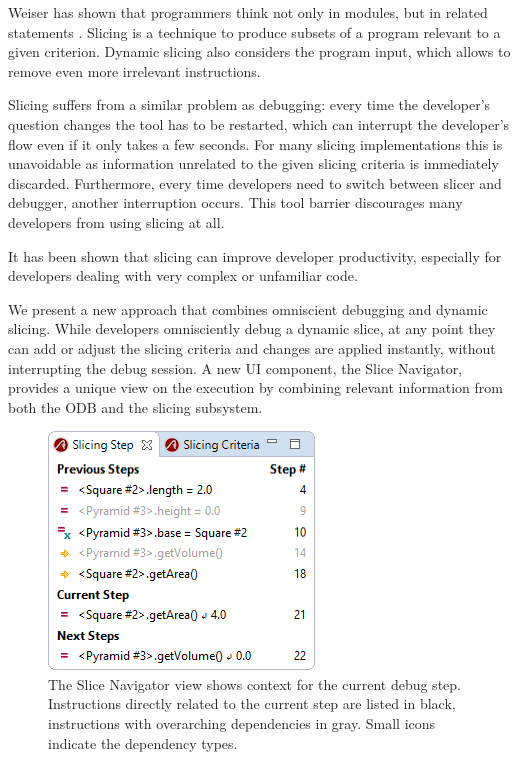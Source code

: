 ﻿\documentclass[
      english,
			conference,
      ]{IEEEtran}
\newcommand{\todo}[2][]{\pdfmargincomment[color=orange,icon=Note,subject={TODO},author={#1}]{#2}}
\begin{document}
Weiser has shown that programmers think not only in modules, but in related statements \cite{weiser_programmers_1982}.
Slicing is a technique to produce subsets of a program relevant to a given criterion.
Dynamic slicing also considers the program input, which allows to remove even more irrelevant instructions\todo{cite}.

Slicing suffers from a similar problem as debugging:
every time the developer's question changes the tool has to be restarted, which can interrupt the developer's flow even if it only takes a few seconds.
For many slicing implementations this is unavoidable as information unrelated to the given slicing criteria is immediately discarded\todo{cite}.
Furthermore, every time developers need to switch between slicer and debugger, another interruption occurs.
This tool barrier discourages many developers from using slicing at all.

It has been shown that slicing can \todo{qualify} improve developer productivity\todo{cite}, especially for developers dealing with very complex or unfamiliar code.

We present a new approach that combines omniscient debugging and dynamic slicing.
While developers omnisciently debug a dynamic slice, at any point they can add or adjust the slicing criteria and changes are applied instantly, without interrupting the debug session.
A new UI component, the Slice Navigator, provides a unique view on the execution by combining relevant information from both the ODB and the slicing subsystem.

\begin{figure}
	\centering
		\includegraphics[width=0.80\linewidth]{slice1.png}
	\caption{The Slice Navigator view shows context for the current debug step. Instructions directly related to the current step are listed in black, instructions with overarching dependencies in gray. Small icons indicate the dependency types.}
	\label{fig:slice1}
\end{figure}
\end{document}

